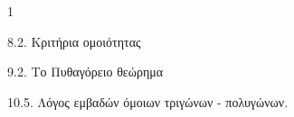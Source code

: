 \begin{ylh}{1}
    \item 8.2. Κριτήρια ομοιότητας
    \item 9.2. Το Πυθαγόρειο θεώρημα
    \item 10.5. Λόγος εμβαδών όμοιων τριγώνων - πολυγώνων.
\end{ylh}
\begin{figure} %
\centering
{}
\end{figure}
